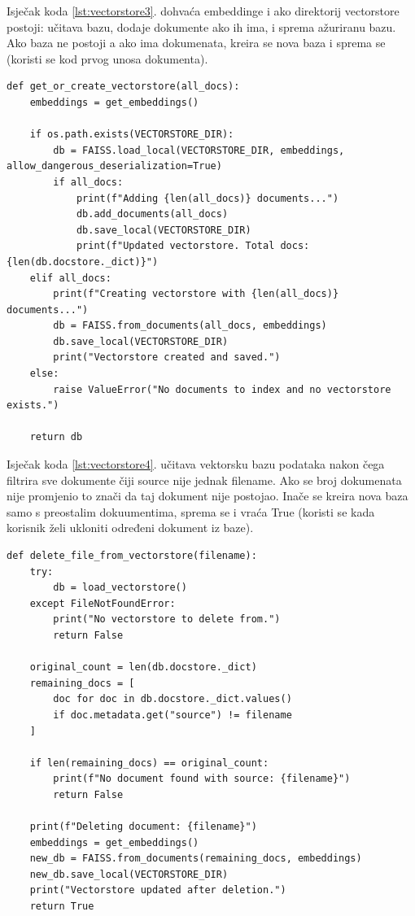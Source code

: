 \documentclass[]{foi}
\begin{document}
Isječak koda \ref{lst:vectorstore3}. dohvaća embeddinge i ako direktorij vectorstore postoji: učitava bazu, dodaje dokumente ako ih ima, i sprema ažuriranu bazu.
Ako baza ne postoji a ako ima dokumenata, kreira se nova baza i sprema se (koristi se kod prvog unosa dokumenta).

\begin{longlisting}
\begin{verbatim}
def get_or_create_vectorstore(all_docs):
    embeddings = get_embeddings()

    if os.path.exists(VECTORSTORE_DIR):
        db = FAISS.load_local(VECTORSTORE_DIR, embeddings, allow_dangerous_deserialization=True)
        if all_docs:
            print(f"Adding {len(all_docs)} documents...")
            db.add_documents(all_docs)
            db.save_local(VECTORSTORE_DIR)
            print(f"Updated vectorstore. Total docs: {len(db.docstore._dict)}")
    elif all_docs:
        print(f"Creating vectorstore with {len(all_docs)} documents...")
        db = FAISS.from_documents(all_docs, embeddings)
        db.save_local(VECTORSTORE_DIR)
        print("Vectorstore created and saved.")
    else:
        raise ValueError("No documents to index and no vectorstore exists.")

    return db
\end{verbatim}
\caption{Vectorstore.py 3/4}
\label{lst:vectorstore3}
\end{longlisting}

Isječak koda \ref{lst:vectorstore4}. učitava vektorsku bazu podataka nakon čega filtrira sve dokumente čiji source nije jednak filename. Ako se broj dokumenata
nije promjenio to znači da taj dokument nije postojao. Inače se kreira nova baza samo s preostalim dokuumentima, sprema se i vraća True (koristi se kada korisnik želi ukloniti određeni dokument iz baze).

\begin{longlisting}
\begin{verbatim}
def delete_file_from_vectorstore(filename):
    try:
        db = load_vectorstore()
    except FileNotFoundError:
        print("No vectorstore to delete from.")
        return False

    original_count = len(db.docstore._dict)
    remaining_docs = [
        doc for doc in db.docstore._dict.values()
        if doc.metadata.get("source") != filename
    ]

    if len(remaining_docs) == original_count:
        print(f"No document found with source: {filename}")
        return False

    print(f"Deleting document: {filename}")
    embeddings = get_embeddings()
    new_db = FAISS.from_documents(remaining_docs, embeddings)
    new_db.save_local(VECTORSTORE_DIR)
    print("Vectorstore updated after deletion.")
    return True
\end{verbatim}
\caption{Vectorstore.py 4/4}
\label{lst:vectorstore4}
\end{longlisting}
\end{document}

